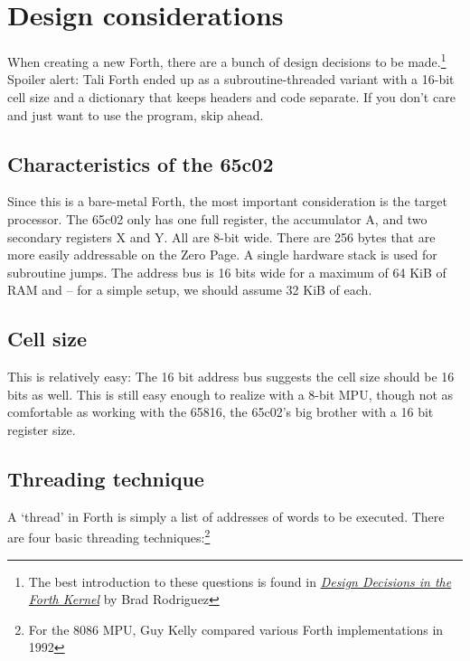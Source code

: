 
\section{Design considerations}

When creating a new Forth, there are a bunch of design decisions to be
made.\footnote{The best introduction to these questions is found in
\href{http://www.bradrodriguez.com/papers/moving1.htm}{\textit{Design Decisions
in the Forth Kernel}} by Brad Rodriguez} Spoiler alert:
Tali Forth ended up as a subroutine-threaded variant with a 16-bit cell size and
a dictionary that keeps headers and code separate. If you don't care and just
want to use the program, skip ahead. 

\subsection{Characteristics of the 65c02}

Since this is a bare-metal Forth, the most important consideration is the target
processor. The 65c02 only has one full register, the accumulator
A, and two secondary registers X and
Y. All are 8-bit wide. There are 256 bytes that are more
easily addressable on the Zero Page. A single hardware stack is
used for subroutine jumps. The address bus is 16 bits wide
for a maximum of 64 KiB of RAM and  -- for a simple setup,
we should assume 32 KiB of each. 

\subsection{Cell size}

This is relatively easy: The 16 bit address bus suggests the
cell size should be 16 bits as well. This is still easy enough to realize with a
8-bit MPU, though not as comfortable as working with the 65816, the
65c02's big brother with a 16 bit register size.


\subsection{Threading technique}

A `thread' in Forth is simply a list of addresses of words to be executed. 
There are four basic threading techniques:\footnote{For the 8086 MPU, Guy
Kelly compared various Forth implementations in
1992\cite{kelly92}}

